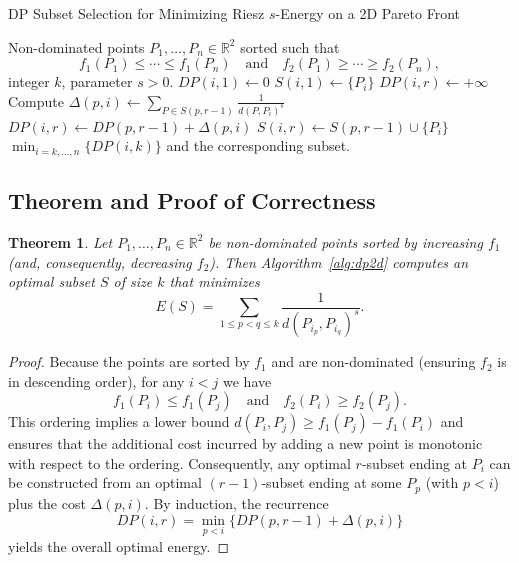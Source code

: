 \documentclass[11pt]{article}
\newtheorem{theorem}{Theorem}
\begin{document}
\begin{algorithm}[H]
\caption{DP Subset Selection for Minimizing Riesz \(s\)-Energy on a 2D Pareto Front}\label{alg:dp2d}
\begin{algorithmic}[1]
\Require Non-dominated points \(P_1,\dots,P_n \in \mathbb{R}^2\) sorted such that 
\[
f_1(P_1) \le \cdots \le f_1(P_n) \quad\text{and}\quad f_2(P_1) \ge \cdots \ge f_2(P_n),
\]
integer \(k\), parameter \(s>0\).
    \State \(DP(i,1) \gets 0\)
    \State \(S(i,1) \gets \{P_i\}\)
\EndFor
{}
        \State \(DP(i,r) \gets +\infty\)
            \State Compute \(\Delta(p,i) \gets \displaystyle \sum_{P\in S(p,r-1)} \frac{1}{d(P,P_i)^s}\)
                \State \(DP(i,r) \gets DP(p,r-1)+\Delta(p,i)\)
                \State \(S(i,r) \gets S(p,r-1)\cup\{P_i\}\)
            \EndIf
        \EndFor
    \EndFor
\EndFor
\State \Return \(\min_{i=k,\dots,n}\{DP(i,k)\}\) and the corresponding subset.
\end{algorithmic}
\end{algorithm}

\subsection{Theorem and Proof of Correctness}

\begin{theorem}
Let \(P_1,\dots,P_n \in \mathbb{R}^2\) be non-dominated points sorted by increasing \(f_1\) (and, consequently, decreasing \(f_2\)). Then Algorithm~\ref{alg:dp2d} computes an optimal subset \(S\) of size \(k\) that minimizes
\[
E(S)=\sum_{1\le p<q\le k}\frac{1}{d(P_{i_p},P_{i_q})^s}.
\]
\end{theorem}

\begin{proof}
Because the points are sorted by \(f_1\) and are non-dominated (ensuring \(f_2\) is in descending order), for any \(i<j\) we have
\[
f_1(P_i) \le f_1(P_j) \quad \text{and} \quad f_2(P_i) \ge f_2(P_j).
\]
This ordering implies a lower bound \(d(P_i,P_j) \ge f_1(P_j)-f_1(P_i)\) and ensures that the additional cost incurred by adding a new point is monotonic with respect to the ordering. Consequently, any optimal \(r\)-subset ending at \(P_i\) can be constructed from an optimal \((r-1)\)-subset ending at some \(P_p\) (with \(p < i\)) plus the cost \(\Delta(p,i)\). By induction, the recurrence 
\[
DP(i,r)=\min_{p< i}\{DP(p,r-1)+\Delta(p,i)\}
\]
yields the overall optimal energy.
\end{proof}
\end{document}
